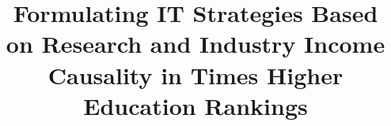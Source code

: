 \documentclass[a4paper, conference]{IEEEtran}
\begin{document}
%

\title{Formulating IT Strategies Based on Research and Industry Income Causality in Times Higher Education Rankings}
\end{document}

